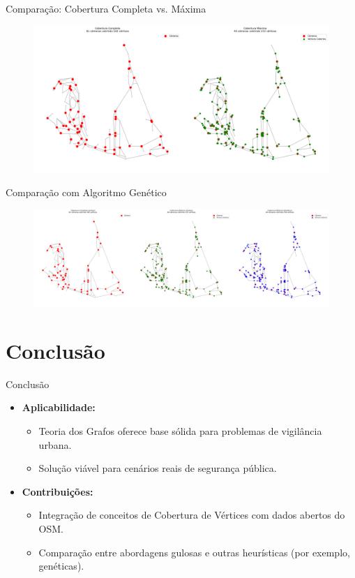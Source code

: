 \documentclass[aspectratio=169,xcolor=table]{beamer}
\begin{document}
\begin{frame}{Comparação: Cobertura Completa vs. Máxima}
    \begin{figure}[H]
        \centering
        \includegraphics[width=\textwidth]{visualizacao_cobertura}
    \end{figure}
\end{frame}

\begin{frame}{Comparação com Algoritmo Genético}
    \begin{figure}[H]
        \centering
        \includegraphics[width=\textwidth]{visualizacao_comparacao}
    \end{figure}
\end{frame}

\section{Conclusão}
\begin{frame}{Conclusão}
    \begin{itemize}
        \item \textbf{Aplicabilidade:}
        \begin{itemize}
            \item Teoria dos Grafos oferece base sólida para problemas de vigilância urbana.
            \item Solução viável para cenários reais de segurança pública.
        \end{itemize}
        \item \textbf{Contribuições:}
        \begin{itemize}
            \item Integração de conceitos de Cobertura de Vértices com dados abertos do OSM.
            \item Comparação entre abordagens gulosas e outras heurísticas (por exemplo, genéticas).
        \end{itemize}
    \end{itemize}
\end{frame}
\end{document}
